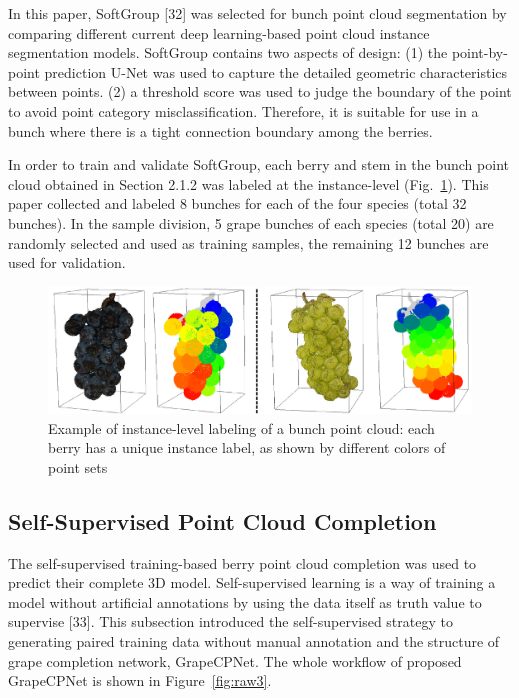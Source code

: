 \documentclass[12pt]{article}
\begin{document}
In this paper, SoftGroup [32] was selected for bunch point cloud segmentation by comparing different current deep learning-based point cloud instance segmentation models. 
SoftGroup contains two aspects of design: 
(1) the point-by-point prediction U-Net was used to capture the detailed geometric characteristics between points. 
(2) a threshold score was used to judge the boundary of the point to avoid point category misclassification. 
Therefore, it is suitable for use in a bunch where there is a tight connection boundary among the berries.

In order to train and validate SoftGroup, each berry and stem in the bunch point cloud obtained in
Section 2.1.2 was labeled at the instance-level (Fig.~\ref{fig:raw11}). 
This paper collected and labeled 8 bunches for each of the four species (total 32 bunches). 
In the sample division, 5 grape bunches of each species (total 20) are randomly selected and used as training samples, the remaining 12 bunches are used for validation.

\begin{figure}[hbt!]
    \centering
    \includegraphics[width=1\textwidth]{figures/Figure6.pdf}
    \caption{Example of instance-level labeling of a bunch point cloud: each berry has a unique instance label, as shown by different colors of point sets}
    \label{fig:raw11}
\end{figure}

\subsection{Self-Supervised Point Cloud Completion}

The self-supervised training-based berry point cloud completion was used to predict their complete 3D model. 
Self-supervised learning is a way of training a model without artificial annotations by using the data itself as truth value to supervise [33]. 
This subsection introduced the self-supervised strategy to generating paired training data without manual annotation and the structure of grape completion network, GrapeCPNet. 
The whole workflow of proposed GrapeCPNet is shown in Figure~\ref{fig:raw3}.
\end{document}
